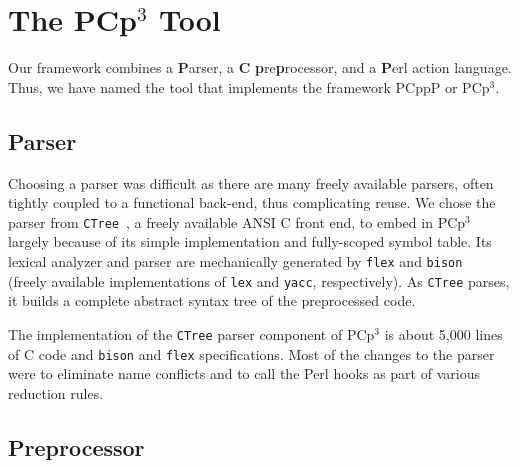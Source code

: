 \documentclass{article}
\newcommand{\pcp}{\mbox{\textsf{PCp}$^3$}}
\newcommand{\pcppp}{\mbox{\textsf{PCppP}}}
\newcommand{\Cpp}{\mbox{\textsf{cpp}}}
\newcommand{\Perl}{\mbox{Perl}}
\newcommand{\C}{\mbox{C}}
\begin{document}
\section{The \pcp{} Tool}
\label{sec:pcp3}

Our framework combines a
\textbf{\textsf{P}}arser, a \textbf{\textsf{C}}
\textbf{\textsf{p}}re\textbf{\textsf{p}}rocessor, and a
\textbf{\textsf{P}}erl action language.  Thus, we have named the tool
that implements the framework \pcppp{} or \pcp{}.  

\subsection{Parser}
\label{ssec:parser}

Choosing a parser was difficult as there are many freely available
parsers, often tightly coupled to a functional back-end, thus
complicating reuse.  We chose the parser from \texttt{CTree}~\cite{CTree}, a
freely available ANSI \C{} front end, to embed in \pcp{}
largely because of its simple implementation and fully-scoped symbol
table.  Its lexical analyzer and parser are mechanically generated
by \texttt{flex} and \texttt{bison}~\cite{BisonAndFlex,Levine92} (freely
available implementations of \texttt{lex} and \texttt{yacc},
respectively).  As \texttt{CTree} parses, it builds a complete abstract
syntax tree of the preprocessed code.

The implementation of the \texttt{CTree} parser component of \pcp{} is
about 5,000 lines of \C{} code and \texttt{bison} and \texttt{flex}
specifications.  Most of the changes to the parser were to eliminate
name conflicts and to call the \Perl{} hooks as part of various
reduction rules.


\subsection{Preprocessor}
\label{ssec:preprocessor}

\end{document}
